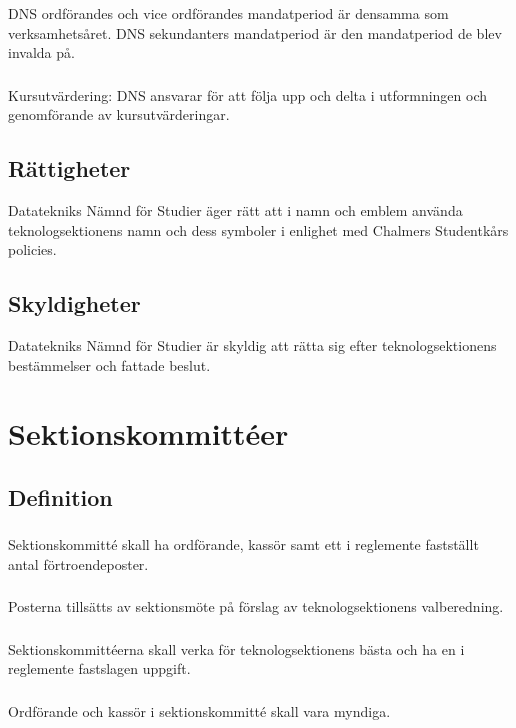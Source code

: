 \documentclass[a4paper]{dtek}
\begin{document}
\subsubsection{}
DNS ordförandes och vice ordförandes mandatperiod är densamma som verksamhetsåret. DNS sekundanters mandatperiod är den mandatperiod de blev invalda på.
\subsubsection{}
Kursutvärdering: DNS ansvarar för att följa upp och delta i utformningen och genomförande av kursutvärderingar.
\subsection{Rättigheter}
Datatekniks Nämnd för Studier äger rätt att i namn och emblem använda teknologsektionens namn och dess symboler i enlighet med Chalmers Studentkårs policies.
\subsection{Skyldigheter}
Datatekniks Nämnd för Studier är skyldig att rätta sig efter teknologsektionens bestämmelser och fattade beslut.
\newpage

\section{Sektionskommittéer}
\subsection{Definition}
\subsubsection{}
Sektionskommitté skall ha ordförande, kassör samt ett i reglemente fastställt antal förtroendeposter.
\subsubsection{}
Posterna tillsätts av sektionsmöte på förslag av teknologsektionens valberedning.
\subsubsection{}
Sektionskommittéerna skall verka för teknologsektionens bästa och ha en i reglemente fastslagen uppgift.
\subsubsection{}
Ordförande och kassör i sektionskommitté skall vara myndiga.
\end{document}
